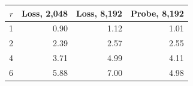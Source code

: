 \begin{tabular}{rrrr}
\toprule
$r$ & Loss, 2,048 & Loss, 8,192 & Probe, 8,192 \\
\midrule
1 & 0.90 & 1.12 & 1.01 \\
2 & 2.39 & 2.57 & 2.55 \\
4 & 3.71 & 4.99 & 4.11 \\
6 & 5.88 & 7.00 & 4.98 \\
\bottomrule
\end{tabular}
